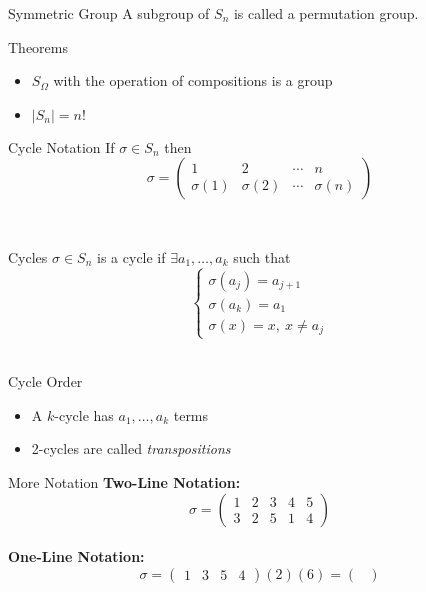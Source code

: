 \documentclass{article}
\begin{document}
\begin{multicols*}{3}
\begin{blackbox}{Symmetric Group}
A subgroup of $S_n$ is called a permutation group.  
\begin{redbox}{Theorems}
    \begin{itemize}
        \item $S_\Omega$ with the operation of compositions is a group
        \item $|S_n| = n!$
    \end{itemize}
\end{redbox}
\begin{brownbox}{Cycle Notation}
    If $\sigma \in S_n$ then
    \[\sigma = \begin{pmatrix}
        1 & 2 & \cdots& n\\
        \sigma(1) & \sigma(2)&  \cdots & \sigma(n)
    \end{pmatrix}\]
\end{brownbox}\\[-2ex]   
\end{blackbox}
\begin{blackbox}{Cycles}
$\sigma \in S_n$ is a cycle if $\exists a_1, \ldots, a_k$ such that 
\[\begin{cases}
    \sigma(a_j) = a_{j+1}\\
    \sigma(a_k) = a_1\\
    \sigma(x) = x, \ x \neq a_j
\end{cases}\]\\[-4ex]
    \begin{bluebox}{Cycle Order}
        \begin{itemize}
            \item A $k$-cycle has $a_1, \ldots, a_k$ terms
            \item 2-cycles are called \emph{transpositions}
        \end{itemize}
    \end{bluebox}
    \begin{brownbox}{More Notation}
        \textbf{Two-Line Notation:}\\[-1ex]
        \[\sigma = \begin{pmatrix}
            1 & 2 & 3 & 4 & 5\\
            3 & 2 & 5 & 1 & 4
        \end{pmatrix}\]\\[-3ex]
        \textbf{One-Line Notation:}\\[-1ex]
        \[\sigma = \begin{pmatrix}
            1 & 3 & 5 & 4
        \end{pmatrix}(2)(6) = \begin{pmatrix}

\end{pmatrix}\]
\end{brownbox}
\end{blackbox}
\end{multicols*}
\end{document}
